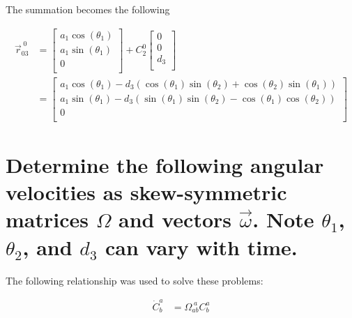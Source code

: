 \begin{parts}
    The summation becomes the following

    \begin{equation*}
        \begin{split}
            \vec{r}^{\;0}_{03} & =
            \begin{bmatrix}
                a_1\cos(\theta_1) \\
                a_1\sin(\theta_1) \\
                0                 \\
            \end{bmatrix}
            +
            C_2^0
            \begin{bmatrix}
                0   \\
                0   \\
                d_3 \\
            \end{bmatrix} \\
            & =
            \begin{bmatrix}
                a_1\cos(\theta_1)-d_3(\cos(\theta_1)\sin(\theta_2)+\cos(\theta_2)\sin(\theta_1))     \\
                a_1\sin(\theta_1) - d_3(\sin(\theta_1)\sin(\theta_2) - \cos(\theta_1)\cos(\theta_2)) \\
                0                                                                                    \\
            \end{bmatrix}
        \end{split}
    \end{equation*}

    \part{Determine the following angular velocities as skew-symmetric matrices $\Omega$ and vectors $\vec{\omega}$. Note $\theta_1$, $\theta_2$, and $d_3$ can vary with time.}
    \begin{subparts}

        \solution
        The following relationship was used to solve these problems:

        \begin{equation}
            \begin{split}
                \dot{C}_b^a & = \Omega^{\;a}_{ab}C_b^a
                \label{eq:cdot}
            \end{split}
        \end{equation}


\end{subparts}
\end{parts}
